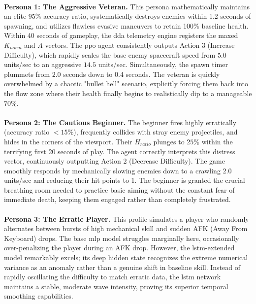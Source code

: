 \paragraph{} \textbf{Persona 1: The Aggressive Veteran.} This persona mathematically maintains an elite 95\% accuracy ratio, systematically destroys enemies within 1.2 seconds of spawning, and utilizes flawless evasive maneuvers to retain 100\% baseline health. Within 40 seconds of gameplay, the \ac{dda} telemetry engine registers the maxed $K_{norm}$ and $A$ vectors. The \ac{ppo} agent consistently outputs Action 3 (Increase Difficulty), which rapidly scales the base enemy spacecraft speed from $5.0$ units/sec to an aggressive $14.5$ units/sec. Simultaneously, the spawn timer plummets from 2.0 seconds down to 0.4 seconds. The veteran is quickly overwhelmed by a chaotic "bullet hell" scenario, explicitly forcing them back into the flow zone where their health finally begins to realistically dip to a manageable $70\%$.
\paragraph{} \textbf{Persona 2: The Cautious Beginner.} The beginner fires highly erratically (accuracy ratio $< 15\%$), frequently collides with stray enemy projectiles, and hides in the corners of the viewport. Their $H_{ratio}$ plunges to $25\%$ within the terrifying first 20 seconds of play. The agent correctly interprets this distress vector, continuously outputting Action 2 (Decrease Difficulty). The game smoothly responds by mechanically slowing enemies down to a crawling $2.0$ units/sec and reducing their hit points to 1. The beginner is granted the crucial breathing room needed to practice basic aiming without the constant fear of immediate death, keeping them engaged rather than completely frustrated.
\paragraph{} \textbf{Persona 3: The Erratic Player.} This profile simulates a player who randomly alternates between bursts of high mechanical skill and sudden AFK (Away From Keyboard) drops. The base \ac{mlp} model struggles marginally here, occasionally over-penalizing the player during an AFK drop. However, the \ac{lstm}-extended model remarkably excels; its deep hidden state recognizes the extreme numerical variance as an anomaly rather than a genuine shift in baseline skill. Instead of rapidly oscillating the difficulty to match erratic data, the \ac{lstm} network maintains a stable, moderate wave intensity, proving its superior temporal smoothing capabilities.

